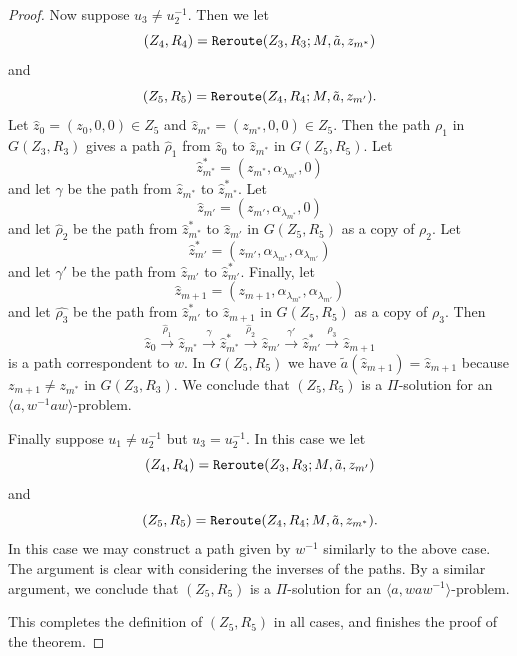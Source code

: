 \documentclass[10pt,a4paper]{amsart}
\theoremstyle{definition}
\theoremstyle{definition}
\numberwithin{equation}{section}
\begin{document}
\begin{proof}
Now suppose $u_3\neq u_2^{-1}$. Then we let
$$ (Z_4, R_4)=\mbox{\tt Reroute}(Z_3, R_3; M, \tilde{a}, z_{m^*}) $$
and 
$$ (Z_5, R_5)=\mbox{\tt Reroute}(Z_4, R_4; M, \tilde{a}, z_{m'}). $$
Let $\hat{z}_0=(z_0, 0,0)\in Z_5$ and $\hat{z}_{m^*}=(z_{m^*}, 0, 0)\in Z_5$. Then the path $\rho_1$ in $G(Z_3, R_3)$ gives a path $\hat{\rho}_1$ from $\hat{z}_0$ to $\hat{z}_{m^*}$ in $G(Z_5, R_5)$. Let 
$$ \hat{z}_{m^*}^*=(z_{m^*}, \alpha_{\lambda_{m^*}}, 0) $$
and let $\gamma$ be the path from $\hat{z}_{m^*}$ to $\hat{z}_{m^*}^*$. Let
$$ \hat{z}_{m'}=(z_{m'}, \alpha_{\lambda_{m^*}}, 0) $$
and let $\hat{\rho}_2$ be the path from $\hat{z}_{m^*}^*$ to $\hat{z}_{m'}$ in $G(Z_5, R_5)$ as a copy of $\rho_2$. Let $$\hat{z}_{m'}^*=(z_{m'},\alpha_{\lambda_{m^*}}, \alpha_{\lambda_{m'}})$$
and let $\gamma'$ be the path from $\hat{z}_{m'}$ to $\hat{z}_{m'}^*$. Finally, let
$$ \hat{z}_{m+1}=(z_{m+1}, \alpha_{\lambda_{m^*}}, \alpha_{\lambda_{m'}})$$
and let $\hat{\rho_3}$ be the path from $\hat{z}_{m'}^*$ to $\hat{z}_{m+1}$ in $G(Z_5, R_5)$ as a copy of $\rho_3$. Then
$$ \hat{z}_0\stackrel{\hat{\rho}_1}{\longrightarrow} \hat{z}_{m^*}\stackrel{\gamma}{\longrightarrow} \hat{z}_{m^*}^* \stackrel{\hat{\rho}_2}{\longrightarrow} \hat{z}_{m'} \stackrel{\gamma'}{\longrightarrow} \hat{z}_{m'}^*\stackrel{\hat{\rho}_3}{\longrightarrow} \hat{z}_{m+1} $$
is a path correspondent to $w$. In $G(Z_5, R_5)$ we have $\tilde{a}(\hat{z}_{m+1})=\hat{z}_{m+1}$ because $z_{m+1}\neq z_{m^*}$ in $G(Z_3, R_3)$. We conclude that $(Z_5, R_5)$ is a $\Pi$-solution for an $\langle a, w^{-1}aw\rangle$-problem.

Finally suppose $u_1\neq u_2^{-1}$ but $u_3=u_2^{-1}$. In this case we let
$$ (Z_4, R_4)=\mbox{\tt Reroute}(Z_3, R_3; M, \tilde{a}, z_{m'}) $$
and 
$$ (Z_5, R_5)=\mbox{\tt Reroute}(Z_4, R_4; M, \tilde{a}, z_{m^*}). $$
In this case we may construct  a path given by $w^{-1}$ similarly to the above case. The argument is clear with considering the inverses of the paths. By a similar argument, we conclude that $(Z_5, R_5)$ is a $\Pi$-solution for an $\langle a, waw^{-1}\rangle$-problem. 

This completes the definition of $(Z_5, R_5)$ in all cases, and finishes the proof of the theorem.
\end{proof}
\end{document}
